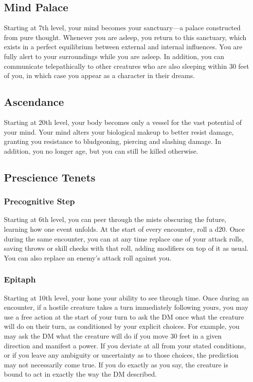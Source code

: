 \subsection{Mind Palace}
Starting at 7th level,
your mind becomes your sanctuary---a palace constructed
from pure thought.
Whenever you are asleep,
you return to this sanctuary,
which exists in a perfect equilibrium between
external and internal influences.
You are fully alert to your surroundings
while you are asleep.
In addition, you can communicate telepathically to other
creatures who are also sleeping within 30 feet of you,
in which case you appear as a character in their dreams.

\subsection{Ascendance}
Starting at 20th level,
your body becomes only a vessel for the vast potential
of your mind.
Your mind alters your biological makeup to better resist damage,
granting you resistance to bludgeoning, piercing and slashing damage.
In addition,
you no longer age,
but you can still be killed otherwise.

\subsection{Prescience Tenets}

\subsubsection{Precognitive Step}
Starting at 6th level,
you can peer through the mists obscuring the future,
learning how one event unfolds.
At the start of every encounter, roll a d20.
Once during the same encounter,
you can at any time replace one of your attack rolls,
saving throws or skill checks with that roll,
adding modifiers on top of it as usual.
You can also replace an enemy's attack roll against you.

\subsubsection{Epitaph}
Starting at 10th level,
your hone your ability to see through time.
Once during an encounter,
if a hostile creature takes a turn immediately following yours,
you may use a free action at the start of your turn
to ask the DM once what the creature will do on their turn,
as conditioned by your explicit choices.
For example,
you may ask the DM what the creature will do
if you move 30 feet in a given direction and manifest a power.
If you deviate at all from your stated conditions,
or if you leave any ambiguity or uncertainty as to those choices,
the prediction may not necessarily come true.
If you do exactly as you say,
the creature is bound to act in exactly the way the DM described.

